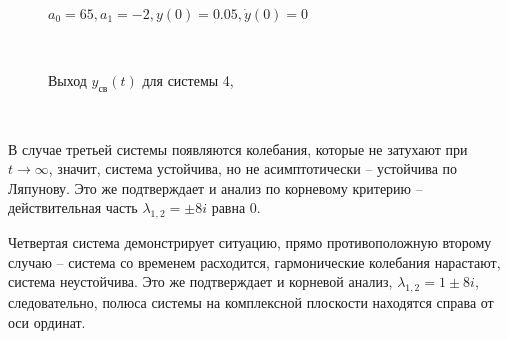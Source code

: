\documentclass[a4paper]{article}
\begin{document}
\begin{figure}[H]
\begin{minipage}{0.5\textwidth}
        \caption{Выход $y_{\text{св}}(t)$ для системы 4,}
        \centerline{$a_0 = 65, a_1 = -2, y(0) = 0.05, \dot{y}(0) = 0$}
    \end{minipage}\\[1em]
\end{figure}\noindent\

В случае третьей системы появляются колебания, которые не затухают при $t \to \infty$, значит, система устойчива, но не асимптотически -- устойчива по Ляпунову. Это же подтверждает и анализ по корневому критерию -- действительная часть $\lambda_{1,2} = \pm 8i$ равна 0.\ 

Четвертая система демонстрирует ситуацию, прямо противоположную второму случаю -- система со временем расходится, гармонические колебания нарастают, система неустойчива. Это же подтверждает и корневой анализ, $\lambda_{1,2} = 1\pm8i$, следовательно, полюса системы на комплексной плоскости находятся справа от оси ординат.
\end{document}
